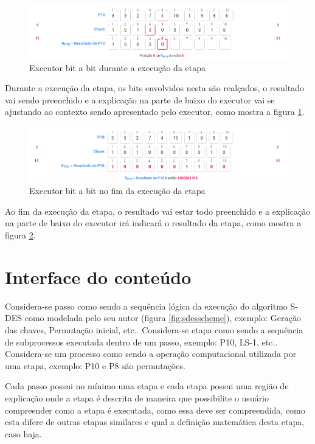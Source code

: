 \begin{figure}[H]
    \centering
    \caption{Executor bit a bit durante a execução da etapa}
    \label{fig:uibitabit2}
    \includegraphics[width=1\linewidth]{UI/UIBitABit2.png}
\end{figure}

Durante a execução da etapa, os bits envolvidos nesta são realçados, o resultado vai sendo preenchido e a explicação na parte de baixo do executor vai se ajustando ao contexto sendo apresentado pelo executor, como mostra a figura \ref{fig:uibitabit2}.

\begin{figure}[H]
    \centering
    \caption{Executor bit a bit no fim da execução da etapa}
    \label{fig:uibitabit3}
    \includegraphics[width=1\linewidth]{UI/UIBitABit3.png}
\end{figure}

Ao fim da execução da etapa, o resultado vai estar todo preenchido e a explicação na parte de baixo do executor irá indicará o resultado da etapa, como mostra a figura \ref{fig:uibitabit3}.

\section{Interface do conteúdo}
Considera-se passo como sendo a sequência lógica da execução do algoritmo S-DES como modelada pelo seu autor (figura \ref{fig:sdesscheme}), exemplo: Geração das chaves, Permutação inicial, etc.. Considera-se etapa como sendo a sequência de subprocessos executada dentro de um passo, exemplo: P10, LS-1, etc.. Considera-se um processo como sendo a operação computacional utilizada por uma etapa, exemplo: P10 e P8 são permutações.

Cada passo possui no mínimo uma etapa e cada etapa possui uma região de explicação onde a etapa é descrita de maneira que possibilite o usuário compreender como a etapa é executada, como essa deve ser compreendida, como esta difere de outras etapas similares e qual a definição matemática desta etapa, caso haja.

